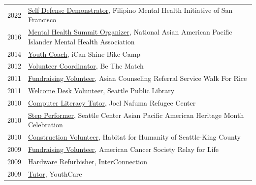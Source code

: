 \documentclass[12pt]{article}
\begin{document}
{\begin{longtable}{R{0.75in}p{5.0in}}
\footnotesize{2022} & \href{https://www.instagram.com/p/Cc8jU07vENh/}{Self Defense Demonstrator}, Filipino Mental Health Initiative of San Francisco\\

\footnotesize{2016} & \href{https://www.facebook.com/events/215634702135825/}{Mental Health Summit Organizer}, National Asian American Pacific Islander Mental Health Association\\

\footnotesize{2014} & \href{https://icanshine.org/}{Youth Coach}, iCan Shine Bike Camp\\

\footnotesize{2012} & \href{https://www.dailyuw.com/news/article_de3524ce-3d5e-5dd2-8de7-5deebee463d9.html}{Volunteer Coordinator}, Be The Match\\

\footnotesize{2011} & \href{https://www.facebook.com/WalkforRice/}{Fundraising Volunteer}, Asian Counseling Referral Service Walk For Rice\\

\footnotesize{2011} & \href{https://www.spl.org}{Welcome Desk Volunteer}, Seattle Public Library\\

\footnotesize{2010} & \href{https://www.habitatskc.org/}{Computer Literacy Tutor}, Joel Nafuma Refugee Center\\

\footnotesize{2010} & \href{https://nwasianweekly.com/2010/05/asian-pacific-american-heritage-at-the-center/}{Step Performer}, Seattle Center Asian Pacific American Heritage Month Celebration\\

\footnotesize{2010} & \href{https://www.habitatskc.org/}{Construction Volunteer}, Habitat for Humanity of Seattle-King County\\

\footnotesize{2009} & \href{https://www.cancer.org/involved/fundraise/relay-for-life.html}{Fundraising Volunteer}, American Cancer Society Relay for Life\\

\footnotesize{2009} & \href{https://www.washington.edu/news/2010/04/22/student-service-and-leadership-to-be-celebrated-april-28/}{Hardware Refurbisher}, InterConnection\\

\footnotesize{2009} & \href{https://youthcare.org}{Tutor}, YouthCare\\


\end{longtable}}
\end{document}
